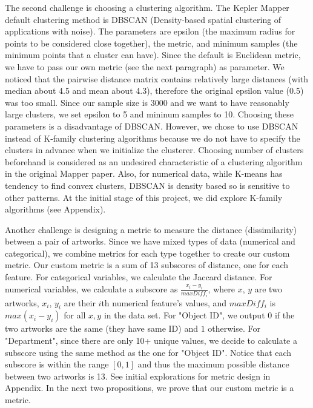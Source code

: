 \documentclass[12pt]{article}
\theoremstyle{definition}
\begin{document}
\newline
\par The second challenge is choosing a clustering algorithm. The Kepler Mapper default clustering method is DBSCAN (Density-based spatial clustering of applications with noise)\cite{dbscan}. The parameters are epsilon (the maximum radius for points to be considered close together), the metric, and minimum samples (the minimum points that a cluster can have). Since the default is Euclidean metric, we have to pass our own metric (see the next paragraph) as parameter. We noticed that the pairwise distance matrix contains relatively large distances (with median about 4.5 and mean about 4.3), therefore the original epsilon value (0.5) was too small. Since our sample size is 3000 and we want to have reasonably large clusters, we set epsilon to 5 and mininum samples to 10. Choosing these parameters is a disadvantage of DBSCAN. However, we chose to use DBSCAN instead of K-family clustering algorithms because we do not have to specify the clusters in advance when we initialize the clusterer. Choosing number of clusters beforehand is considered as an undesired characteristic of a clustering algorithm in the original Mapper paper\cite{originalmapper}. Also, for numerical data, while K-means has tendency to find convex clusters, DBSCAN is density based so is sensitive to other patterns\cite{Kmodes_paper}. At the initial stage of this project, we did explore K-family algorithms (see Appendix).
\newline
\par Another challenge is designing a metric to measure the distance (dissimilarity) between a pair of artworks. Since we have mixed types of data (numerical and categorical), we combine metrics for each type together to create our custom metric. Our custom metric is a sum of 13 subscores of distance, one for each feature. For categorical variables, we calculate the Jaccard distance\cite{jaccard}. For numerical variables, we calculate a subscore as $\frac{x_i-y_i}{maxDiff_i}$, where $x$, $y$ are two artworks, $x_i$, $y_i$ are their $i$th numerical feature's values, and $maxDiff_i$ is $max(x_i-y_i)$ for all $x, y$ in the data set. For "Object ID", we output $0$ if the two artworks are the same (they have same ID) and $1$ otherwise. For "Department", since there are only 10+ unique values, we decide to calculate a subscore using the same method as the one for "Object ID". Notice that each subscore is within the range $[0, 1]$ and thus the maximum possible distance between two artworks is 13. See initial explorations for metric design in Appendix. In the next two propositions, we prove that our custom metric is a metric.
\end{document}
